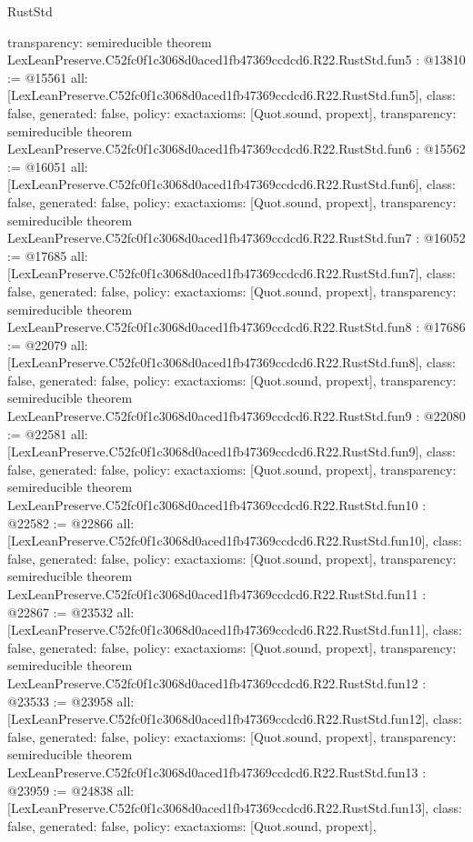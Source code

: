 \begin{lexlean}{RustStd}
\begin{coremodule}
{  transparency: semireducible
}
theorem LexLeanPreserve.C52fc0f1c3068d0aced1fb47369ccdcd6.R22.RustStd.fun5 : @13810 := @15561 {
  all: [LexLeanPreserve.C52fc0f1c3068d0aced1fb47369ccdcd6.R22.RustStd.fun5],
  class: false,
  generated: false,
  policy: exact{axioms: [Quot.sound, propext]},
  transparency: semireducible
}
theorem LexLeanPreserve.C52fc0f1c3068d0aced1fb47369ccdcd6.R22.RustStd.fun6 : @15562 := @16051 {
  all: [LexLeanPreserve.C52fc0f1c3068d0aced1fb47369ccdcd6.R22.RustStd.fun6],
  class: false,
  generated: false,
  policy: exact{axioms: [Quot.sound, propext]},
  transparency: semireducible
}
theorem LexLeanPreserve.C52fc0f1c3068d0aced1fb47369ccdcd6.R22.RustStd.fun7 : @16052 := @17685 {
  all: [LexLeanPreserve.C52fc0f1c3068d0aced1fb47369ccdcd6.R22.RustStd.fun7],
  class: false,
  generated: false,
  policy: exact{axioms: [Quot.sound, propext]},
  transparency: semireducible
}
theorem LexLeanPreserve.C52fc0f1c3068d0aced1fb47369ccdcd6.R22.RustStd.fun8 : @17686 := @22079 {
  all: [LexLeanPreserve.C52fc0f1c3068d0aced1fb47369ccdcd6.R22.RustStd.fun8],
  class: false,
  generated: false,
  policy: exact{axioms: [Quot.sound, propext]},
  transparency: semireducible
}
theorem LexLeanPreserve.C52fc0f1c3068d0aced1fb47369ccdcd6.R22.RustStd.fun9 : @22080 := @22581 {
  all: [LexLeanPreserve.C52fc0f1c3068d0aced1fb47369ccdcd6.R22.RustStd.fun9],
  class: false,
  generated: false,
  policy: exact{axioms: [Quot.sound, propext]},
  transparency: semireducible
}
theorem LexLeanPreserve.C52fc0f1c3068d0aced1fb47369ccdcd6.R22.RustStd.fun10 : @22582 := @22866 {
  all: [LexLeanPreserve.C52fc0f1c3068d0aced1fb47369ccdcd6.R22.RustStd.fun10],
  class: false,
  generated: false,
  policy: exact{axioms: [Quot.sound, propext]},
  transparency: semireducible
}
theorem LexLeanPreserve.C52fc0f1c3068d0aced1fb47369ccdcd6.R22.RustStd.fun11 : @22867 := @23532 {
  all: [LexLeanPreserve.C52fc0f1c3068d0aced1fb47369ccdcd6.R22.RustStd.fun11],
  class: false,
  generated: false,
  policy: exact{axioms: [Quot.sound, propext]},
  transparency: semireducible
}
theorem LexLeanPreserve.C52fc0f1c3068d0aced1fb47369ccdcd6.R22.RustStd.fun12 : @23533 := @23958 {
  all: [LexLeanPreserve.C52fc0f1c3068d0aced1fb47369ccdcd6.R22.RustStd.fun12],
  class: false,
  generated: false,
  policy: exact{axioms: [Quot.sound, propext]},
  transparency: semireducible
}
theorem LexLeanPreserve.C52fc0f1c3068d0aced1fb47369ccdcd6.R22.RustStd.fun13 : @23959 := @24838 {
  all: [LexLeanPreserve.C52fc0f1c3068d0aced1fb47369ccdcd6.R22.RustStd.fun13],
  class: false,
  generated: false,
  policy: exact{axioms: [Quot.sound, propext]},
}
\end{coremodule}
\end{lexlean}
